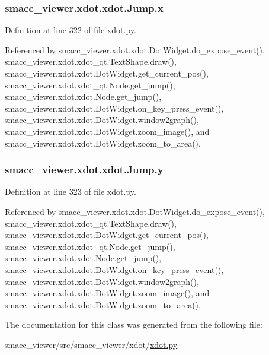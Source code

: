 \subsubsection[{\texorpdfstring{x}{x}}]{\setlength{\rightskip}{0pt plus 5cm}smacc\+\_\+viewer.\+xdot.\+xdot.\+Jump.\+x}\hypertarget{classsmacc__viewer_1_1xdot_1_1xdot_1_1Jump_aa4319356dbccd819bc97cc09d7a0bf09}{}\label{classsmacc__viewer_1_1xdot_1_1xdot_1_1Jump_aa4319356dbccd819bc97cc09d7a0bf09}


Definition at line 322 of file xdot.\+py.



Referenced by smacc\+\_\+viewer.\+xdot.\+xdot.\+Dot\+Widget.\+do\+\_\+expose\+\_\+event(), smacc\+\_\+viewer.\+xdot.\+xdot\+\_\+qt.\+Text\+Shape.\+draw(), smacc\+\_\+viewer.\+xdot.\+xdot.\+Dot\+Widget.\+get\+\_\+current\+\_\+pos(), smacc\+\_\+viewer.\+xdot.\+xdot\+\_\+qt.\+Node.\+get\+\_\+jump(), smacc\+\_\+viewer.\+xdot.\+xdot.\+Node.\+get\+\_\+jump(), smacc\+\_\+viewer.\+xdot.\+xdot.\+Dot\+Widget.\+on\+\_\+key\+\_\+press\+\_\+event(), smacc\+\_\+viewer.\+xdot.\+xdot.\+Dot\+Widget.\+window2graph(), smacc\+\_\+viewer.\+xdot.\+xdot.\+Dot\+Widget.\+zoom\+\_\+image(), and smacc\+\_\+viewer.\+xdot.\+xdot.\+Dot\+Widget.\+zoom\+\_\+to\+\_\+area().

\subsubsection[{\texorpdfstring{y}{y}}]{\setlength{\rightskip}{0pt plus 5cm}smacc\+\_\+viewer.\+xdot.\+xdot.\+Jump.\+y}\hypertarget{classsmacc__viewer_1_1xdot_1_1xdot_1_1Jump_a7a95126431e515149487604d46fc3623}{}\label{classsmacc__viewer_1_1xdot_1_1xdot_1_1Jump_a7a95126431e515149487604d46fc3623}


Definition at line 323 of file xdot.\+py.



Referenced by smacc\+\_\+viewer.\+xdot.\+xdot.\+Dot\+Widget.\+do\+\_\+expose\+\_\+event(), smacc\+\_\+viewer.\+xdot.\+xdot\+\_\+qt.\+Text\+Shape.\+draw(), smacc\+\_\+viewer.\+xdot.\+xdot.\+Dot\+Widget.\+get\+\_\+current\+\_\+pos(), smacc\+\_\+viewer.\+xdot.\+xdot\+\_\+qt.\+Node.\+get\+\_\+jump(), smacc\+\_\+viewer.\+xdot.\+xdot.\+Node.\+get\+\_\+jump(), smacc\+\_\+viewer.\+xdot.\+xdot.\+Dot\+Widget.\+on\+\_\+key\+\_\+press\+\_\+event(), smacc\+\_\+viewer.\+xdot.\+xdot.\+Dot\+Widget.\+window2graph(), smacc\+\_\+viewer.\+xdot.\+xdot.\+Dot\+Widget.\+zoom\+\_\+image(), and smacc\+\_\+viewer.\+xdot.\+xdot.\+Dot\+Widget.\+zoom\+\_\+to\+\_\+area().



The documentation for this class was generated from the following file\+:\begin{DoxyCompactItemize}
\item 
smacc\+\_\+viewer/src/smacc\+\_\+viewer/xdot/\hyperlink{xdot_8py}{xdot.\+py}\end{DoxyCompactItemize}
